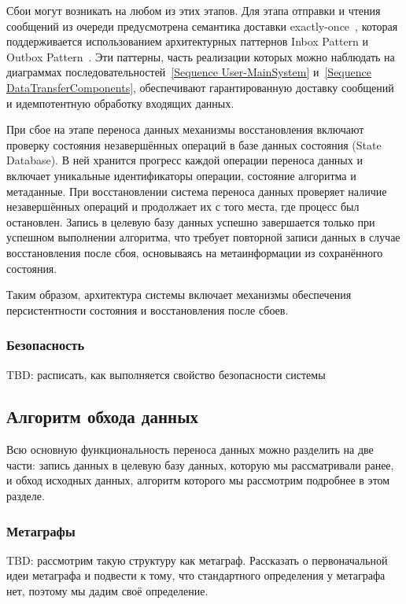 Сбои могут возникать на любом из этих этапов. Для этапа отправки и чтения сообщений из очереди предусмотрена семантика доставки exactly-once~\cite{delivery-guarantees}, которая поддерживается использованием архитектурных паттернов Inbox Pattern и Outbox Pattern~\cite{outbox-and-inbox}. Эти паттерны, часть реализации которых можно наблюдать на диаграммах последовательностей~\ref{Sequence User-MainSystem} и~\ref{Sequence DataTransferComponents}, обеспечивают гарантированную доставку сообщений и идемпотентную обработку входящих данных.

При сбое на этапе переноса данных механизмы восстановления включают проверку состояния незавершённых операций в базе данных состояния (State Database). В ней хранится прогресс каждой операции переноса данных и включает уникальные идентификаторы операции, состояние алгоритма и метаданные. При восстановлении система переноса данных проверяет наличие незавершённых операций и продолжает их с того места, где процесс был остановлен. Запись в целевую базу данных успешно завершается только при успешном выполнении алгоритма, что требует повторной записи данных в случае восстановления после сбоя, основываясь на метаинформации из сохранённого состояния.

Таким образом, архитектура системы включает механизмы обеспечения персистентности состояния и восстановления после сбоев.

\subsubsection{Безопасность}

TBD: расписать, как выполняется свойство безопасности системы

\subsection{Алгоритм обхода данных}

Всю основную функциональность переноса данных можно разделить на две части: запись данных в целевую базу данных, которую мы рассматривали ранее, и обход исходных данных, алгоритм которого мы рассмотрим подробнее в этом разделе.

\subsubsection{Метаграфы}
TBD: рассмотрим такую структуру как метаграф. Рассказать о первоначальной идеи метаграфа и подвести к тому, что стандартного определения у метаграфа нет, поэтому мы дадим своё определение.

